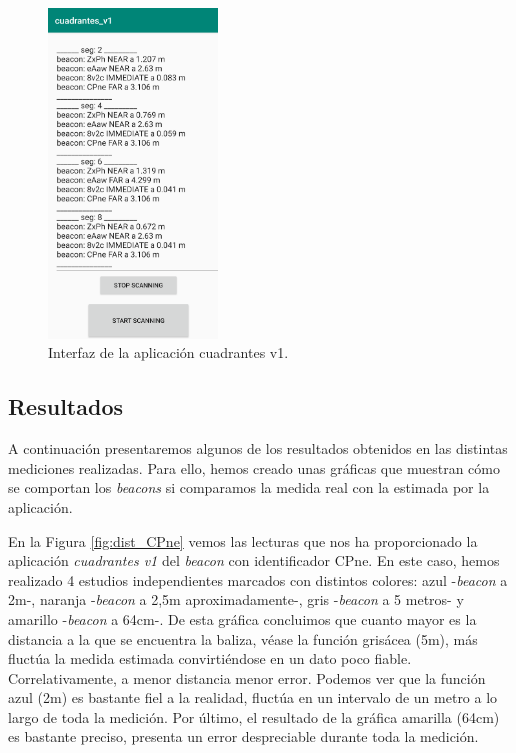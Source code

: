 \begin{figure}[t]
	\centering
	\includegraphics[width=0.4\textwidth]{Imagenes/Descripciondeltrabajo/cuadrantes_v1}
	\caption{Interfaz de la aplicación cuadrantes v1.}
	\label{fig:cuadrantesv1}
\end{figure}


\subsection{Resultados}

A continuación presentaremos algunos de los resultados obtenidos en las distintas mediciones realizadas. Para ello, hemos creado unas gráficas que muestran cómo se comportan los \textit{beacons} si comparamos la medida real con la estimada por la aplicación. 

En la Figura \ref{fig:dist_CPne} vemos las lecturas que nos ha proporcionado la aplicación \textit{cuadrantes v1} del \textit{beacon} con identificador CPne. En este caso, hemos realizado 4 estudios independientes marcados con distintos colores: azul -\textit{beacon} a 2m-, naranja -\textit{beacon} a 2,5m aproximadamente-, gris -\textit{beacon} a 5 metros- y amarillo -\textit{beacon} a 64cm-. De esta gráfica concluimos que cuanto mayor es la distancia a la que se encuentra la baliza, véase la función grisácea (5m), más fluctúa la medida estimada convirtiéndose en un dato poco fiable. Correlativamente, a menor distancia menor error. Podemos ver que la función azul (2m) es bastante fiel a la realidad, fluctúa en un intervalo de un metro a lo largo de toda la medición. Por último, el resultado de la gráfica amarilla (64cm) es bastante preciso, presenta un error despreciable durante toda la medición.

